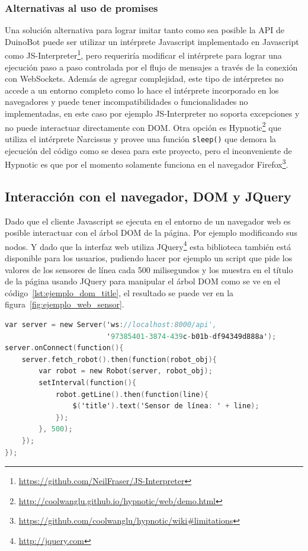 \subsubsection{Alternativas al uso de promises}

Una solución alternativa para lograr imitar tanto como sea posible la
API de DuinoBot puede ser utilizar un intérprete Javascript implementado en
Javascript como
JS-Interpreter\footnote{\url{https://github.com/NeilFraser/JS-Interpreter}},
pero requeriría modificar el intérprete para lograr una ejecución paso a paso
controlada por el flujo de mensajes a través de la conexión con WebSockets.
Además de agregar complejidad, este tipo de intérpretes no accede a un entorno
completo como lo hace el intérprete incorporado en los navegadores y puede
tener incompatibilidades o funcionalidades no implementadas, en este caso
por ejemplo JS-Interpreter no soporta excepciones y no puede interactuar
directamente con DOM. Otra opción es
Hypnotic\footnote{\url{http://coolwanglu.github.io/hypnotic/web/demo.html}}
que utiliza el intérprete Narcissus y provee una función \texttt{sleep()} que
demora la ejecución del código como se desea para este proyecto, pero el
inconveniente de Hypnotic es que por el momento solamente funciona en el
navegador
Firefox\footnote{\url{https://github.com/coolwanglu/hypnotic/wiki\#limitations}}.


\subsection{Interacción con el navegador, DOM y JQuery}

Dado que el cliente Javascript se ejecuta en el entorno de un navegador web es posible
interactuar con el árbol DOM de la página. Por ejemplo modificando sus nodos.
Y dado que la interfaz web utiliza
JQuery\footnote{\url{http://jquery.com}}
esta biblioteca también está disponible
para los usuarios, pudiendo hacer por ejemplo un script que pide los valores
de los sensores de línea cada 500 milisegundos y los muestra en el título de la
página usando JQuery para manipular el árbol DOM como se ve en el
código~\ref{lst:ejemplo_dom_title}, el resultado se puede ver en la
figura~\ref{fig:ejemplo_web_sensor}.

\begin{lstlisting}[language=C,
caption={Manipulación de DOM con JQuery desde
XRemoteBot para Javascript},
label={lst:ejemplo_dom_title}]
var server = new Server('ws://localhost:8000/api',
                        '97385401-3874-439c-b01b-df94349d888a');
server.onConnect(function(){
    server.fetch_robot().then(function(robot_obj){
        var robot = new Robot(server, robot_obj);
        setInterval(function(){
            robot.getLine().then(function(line){
                $('title').text('Sensor de línea: ' + line);
            });
        }, 500);
    });
});
\end{lstlisting}

